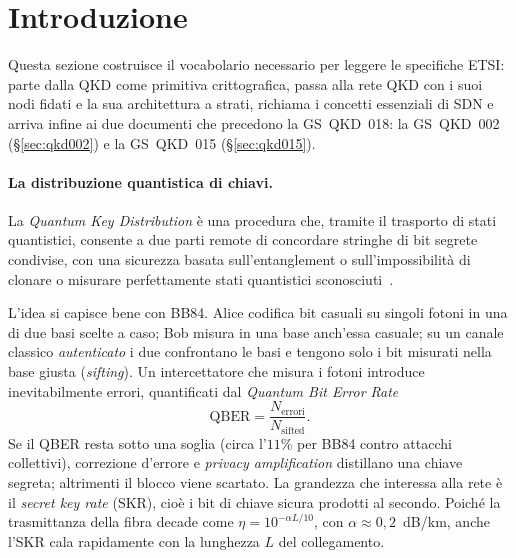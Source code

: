 \section{Introduzione}
\label{sec:intro}

Questa sezione costruisce il vocabolario necessario per leggere le
specifiche ETSI: parte dalla QKD come primitiva crittografica, passa alla
rete QKD con i suoi nodi fidati e la sua architettura a strati, richiama i
concetti essenziali di SDN e arriva infine ai due documenti che precedono la
GS~QKD~018: la GS~QKD~002 (§\ref{sec:qkd002}) e la GS~QKD~015
(§\ref{sec:qkd015}).

\paragraph{La distribuzione quantistica di chiavi.}

\begin{definition}[QKD]
La \emph{Quantum Key Distribution} è una procedura che, tramite il
trasporto di stati quantistici, consente a due parti remote di concordare
stringhe di bit segrete condivise, con una sicurezza basata
sull'entanglement o sull'impossibilità di clonare o misurare perfettamente
stati quantistici sconosciuti~\cite{qkd018}.
\end{definition}

L'idea si capisce bene con BB84. Alice codifica bit casuali su singoli
fotoni in una di due basi scelte a caso; Bob misura in una base anch'essa
casuale; su un canale classico \emph{autenticato} i due confrontano le basi
e tengono solo i bit misurati nella base giusta (\emph{sifting}). Un
intercettatore che misura i fotoni introduce inevitabilmente errori,
quantificati dal \emph{Quantum Bit Error Rate}
\begin{equation}
  \mathrm{QBER} = \frac{N_{\text{errori}}}{N_{\text{sifted}}} .
\end{equation}
Se il QBER resta sotto una soglia (circa l'$11\%$ per BB84 contro attacchi
collettivi), correzione d'errore e \emph{privacy amplification} distillano
una chiave segreta; altrimenti il blocco viene scartato. La grandezza che
interessa alla rete è il \emph{secret key rate} (SKR), cioè i bit di chiave
sicura prodotti al secondo. Poiché la trasmittanza della fibra decade come
$\eta = 10^{-\alpha L/10}$, con $\alpha \approx 0{,}2$~dB/km, anche l'SKR
cala rapidamente con la lunghezza $L$ del collegamento.

